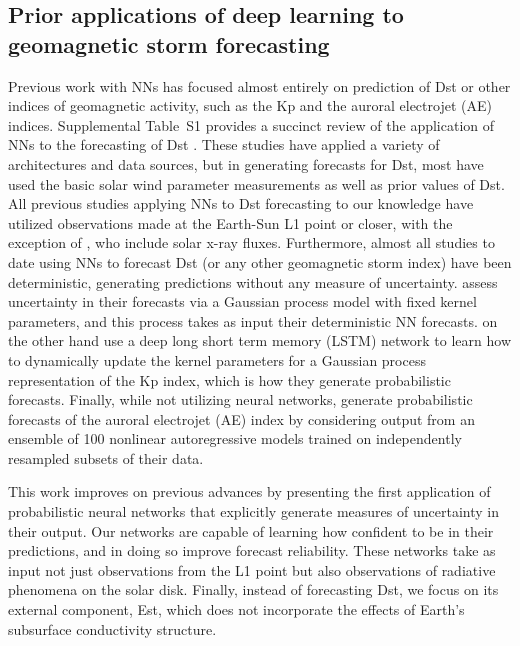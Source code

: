 \documentclass[draft,linenumbers]{agujournal2018}
\begin{document}
\subsection{Prior applications of deep learning to geomagnetic storm forecasting}\label{sec:prior_work}
Previous work with NNs has focused almost entirely on prediction of Dst or other indices of geomagnetic activity, such as the Kp and the auroral electrojet (AE) indices. Supplemental Table~S1 provides a succinct review of the application of NNs to the forecasting of Dst \citep{Andriyas2015, Bala2012, Gleisner1996, Jankovivcova2002, Kugblenu1999, Lazzus2017, Munsami2000, Pallocchia2006, Revallo2014, Sharifie2006, Stepanova2005, Stepanova2000, Wei2007, Wu1996, Wu1997a}. These studies have applied a variety of architectures and data sources, but in generating forecasts for Dst, most have used the basic solar wind parameter measurements as well as prior values of Dst. All previous studies applying NNs to Dst forecasting to our knowledge have utilized observations made at the Earth-Sun L1 point or closer, with the exception of \cite{Chakraborty2020}, who include solar x-ray fluxes. Furthermore, almost all studies to date using NNs to forecast Dst (or any other geomagnetic storm index) have been deterministic, generating predictions without any measure of uncertainty. \cite{Gruet2018} assess uncertainty in their forecasts via a Gaussian process model with fixed kernel parameters, and this process takes as input their deterministic NN forecasts. \cite{Chakraborty2020} on the other hand use a deep long short term memory (LSTM) network to learn how to dynamically update the kernel parameters for a Gaussian process representation of the Kp index, which is how they generate probabilistic forecasts. Finally, while not utilizing neural networks, \cite{Gu2019} generate probabilistic forecasts of the auroral electrojet (AE) index by considering output from an ensemble of 100 nonlinear autoregressive models trained on independently resampled subsets of their data.

This work improves on previous advances by presenting the first application of probabilistic neural networks that explicitly generate measures of uncertainty in their output. Our networks are capable of learning how confident to be in their predictions, and in doing so improve forecast reliability. These networks take as input not just observations from the L1 point but also observations of radiative phenomena on the solar disk. Finally, instead of forecasting Dst, we focus on its external component, Est, which does not incorporate the effects of Earth's subsurface conductivity structure.
\end{document}
